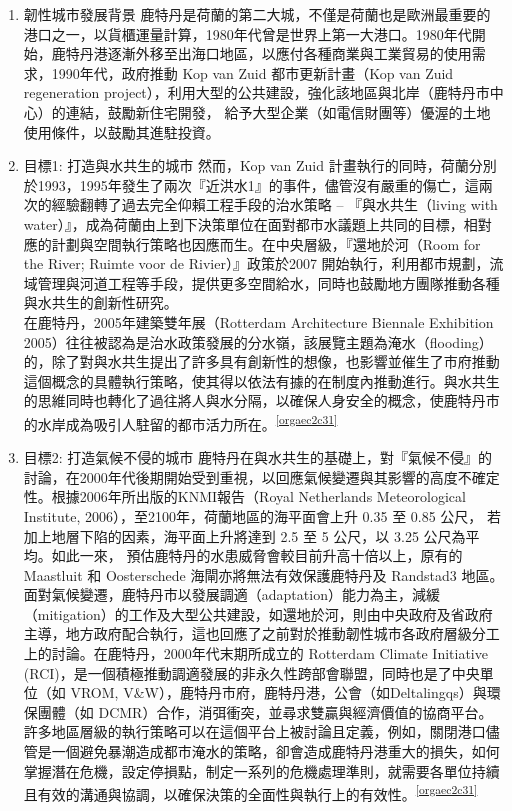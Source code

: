 \documentclass[a4paper,12pt]{article}
\begin{document}
\begin{enumerate}
\item 韌性城市發展背景
\label{sec:orgce50a3f}
鹿特丹是荷蘭的第二大城，不僅是荷蘭也是歐洲最重要的港口之一，以貨櫃運量計算，1980年代曾是世界上第一大港口。1980年代開始，鹿特丹港逐漸外移至出海口地區，以應付各種商業與工業貿易的使用需求，1990年代，政府推動 Kop van Zuid 都市更新計畫（Kop van Zuid regeneration project），利用大型的公共建設，強化該地區與北岸（鹿特丹市中心）的連結，鼓勵新住宅開發， 給予大型企業（如電信財團等）優渥的土地使用條件，以鼓勵其進駐投資。\\

\item 目標1: 打造與水共生的城市
\label{sec:org559dd39}
然而，Kop van Zuid 計畫執行的同時，荷蘭分別於1993，1995年發生了兩次『近洪水1』的事件，儘管沒有嚴重的傷亡，這兩次的經驗翻轉了過去完全仰賴工程手段的治水策略 – 『與水共生（living with water）』，成為荷蘭由上到下決策單位在面對都市水議題上共同的目標，相對應的計劃與空間執行策略也因應而生。在中央層級，『還地於河（Room for the River; Ruimte voor de Rivier）』政策於2007 開始執行，利用都市規劃，流域管理與河道工程等手段，提供更多空間給水，同時也鼓勵地方團隊推動各種與水共生的創新性研究。\\

在鹿特丹，2005年建築雙年展（Rotterdam Architecture Biennale Exhibition 2005）往往被認為是治水政策發展的分水嶺，該展覽主題為淹水（flooding）的，除了對與水共生提出了許多具有創新性的想像，也影響並催生了市府推動這個概念的具體執行策略，使其得以依法有據的在制度內推動進行。與水共生的思維同時也轉化了過往將人與水分隔，以確保人身安全的概念，使鹿特丹市的水岸成為吸引人駐留的都市活力所在。\textsuperscript{\ref{orgaec2c31}}\\

\item 目標2: 打造氣候不侵的城市
\label{sec:orgf39c45d}
鹿特丹在與水共生的基礎上，對『氣候不侵』的討論，在2000年代後期開始受到重視，以回應氣候變遷與其影響的高度不確定性。根據2006年所出版的KNMI報告（Royal Netherlands Meteorological Institute, 2006），至2100年，荷蘭地區的海平面會上升 0.35 至 0.85 公尺， 若加上地層下陷的因素，海平面上升將達到 2.5 至 5 公尺，以 3.25 公尺為平均。如此一來， 預估鹿特丹的水患威脅會較目前升高十倍以上，原有的 Maastluit 和 Oosterschede 海閘亦將無法有效保護鹿特丹及 Randstad3 地區。\\

面對氣候變遷，鹿特丹市以發展調適（adaptation）能力為主，減緩（mitigation）的工作及大型公共建設，如還地於河，則由中央政府及省政府主導，地方政府配合執行，這也回應了之前對於推動韌性城市各政府層級分工上的討論。在鹿特丹，2000年代末期所成立的 Rotterdam Climate Initiative (RCI)，是一個積極推動調適發展的非永久性跨部會聯盟，同時也是了中央單位（如 VROM, V\&W），鹿特丹市府，鹿特丹港，公會（如Deltalingqs）與環保團體（如 DCMR）合作，消弭衝突，並尋求雙贏與經濟價值的協商平台。許多地區層級的執行策略可以在這個平台上被討論且定義，例如，關閉港口儘管是一個避免暴潮造成都市淹水的策略，卻會造成鹿特丹港重大的損失，如何掌握潛在危機，設定停損點，制定一系列的危機處理準則，就需要各單位持續且有效的溝通與協調，以確保決策的全面性與執行上的有效性。\textsuperscript{\ref{orgaec2c31}}\\


\end{enumerate}
\end{document}
